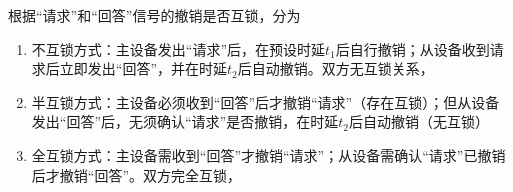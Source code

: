 \documentclass[./computer-organization-and-architecture.tex]{subfiles}
\begin{document}
    根据“请求”和“回答”信号的撤销是否互锁，分为

    \begin{enumerate}
        \item 不互锁方式：主设备发出“请求”后，在预设时延$t_1$后自行撤销；从设备收到请求后立即发出“回答”，并在时延$t_2$后自动撤销。双方无互锁关系，{\color{customgreen}{速度最快，可靠性最差}}
        \item 半互锁方式：主设备必须收到“回答”后才撤销“请求”（存在互锁）；但从设备发出“回答”后，无须确认“请求”是否撤销，在时延$t_2$后自动撤销（无互锁）
        \item 全互锁方式：主设备需收到“回答”才撤销“请求”；从设备需确认“请求”已撤销后才撤销“回答”。双方完全互锁，{\color{customgreen}{可靠性最好，速度最慢}}
    \end{enumerate}
\end{document}
